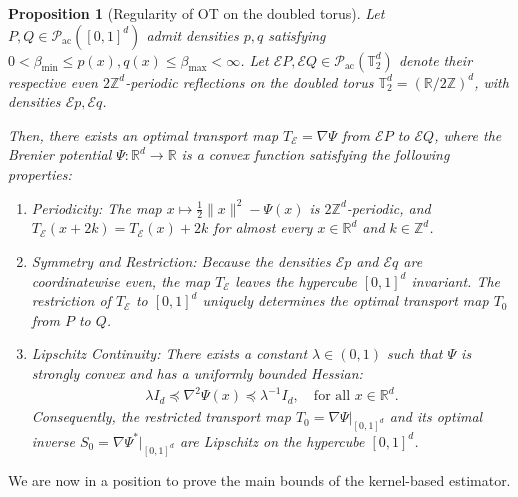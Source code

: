 \documentclass[11pt,reqno]{amsart}
\newtheorem{proposition}[theorem]{Proposition}
\theoremstyle{definition}
\begin{document}
\begin{proposition}[{Regularity of OT on the doubled torus}]
\label{prop:torus_ot_doubled}
Let $P, Q \in \mathcal{P}_{\mathrm{ac}}([0,1]^d)$ admit densities $p, q$ satisfying $0 < \beta_{\min} \le p(x), q(x) \le \beta_{\max} < \infty$. Let $\mathcal{E}P, \mathcal{E}Q \in \mathcal{P}_{\mathrm{ac}}(\mathbb{T}_2^d)$ denote their respective even $2\mathbb{Z}^d$-periodic reflections on the doubled torus $\mathbb{T}_2^d = (\mathbb{R}/2\mathbb{Z})^d$, with densities $\mathcal{E}p, \mathcal{E}q$.

Then, there exists an optimal transport map $T_{\mathcal{E}} = \nabla \Psi$ from $\mathcal{E}P$ to $\mathcal{E}Q$, where the Brenier potential $\Psi: \mathbb{R}^d \to \mathbb{R}$ is a convex function satisfying the following properties:
\begin{enumerate}
    \item \emph{Periodicity}: The map $x \mapsto \frac{1}{2}\|x\|^2 - \Psi(x)$ is $2\mathbb{Z}^d$-periodic, and $T_{\mathcal{E}}(x+2k) = T_{\mathcal{E}}(x) + 2k$ for almost every $x \in \mathbb{R}^d$ and $k \in \mathbb{Z}^d$.
    \item \emph{Symmetry and Restriction}: Because the densities $\mathcal{E}p$ and $\mathcal{E}q$ are coordinatewise even, the map $T_{\mathcal{E}}$ leaves the hypercube $[0,1]^d$ invariant. The restriction of $T_{\mathcal{E}}$ to $[0,1]^d$ uniquely determines the optimal transport map $T_0$ from $P$ to $Q$.
    \item \emph{Lipschitz Continuity}: There exists a constant $\lambda \in (0,1)$ such that $\Psi$ is strongly convex and has a uniformly bounded Hessian:
    \begin{align}
        \lambda I_d \preceq \nabla^2 \Psi(x) \preceq \lambda^{-1} I_d, \quad \text{for all } x \in \mathbb{R}^d.
    \end{align}
    Consequently, the restricted transport map $T_0 = \nabla \Psi|_{[0,1]^d}$ and its optimal inverse $S_0 = \nabla \Psi^*|_{[0,1]^d}$ are Lipschitz on the hypercube $[0,1]^d$.
\end{enumerate}
\end{proposition}

We are now in a position to prove the main bounds of the kernel-based estimator.
\end{document}
